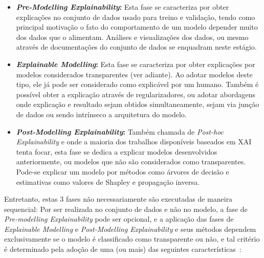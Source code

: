 \documentclass[portugues]{ic-tese}
\begin{document}
\begin{itemize}
\item \textbf{\textit{Pre-Modelling Explainability}:} Esta fase se caracteriza por obter explicações no conjunto de dados usado para treino e validação, tendo como principal motivação o fato do comportamento de um modelo depender muito dos dados que o alimentam. Análises e visualizações dos dados, ou mesmo através de documentações do conjunto de dados se enquadram neste estágio.~\citep{Khalegi_2019_Pre} 
\item \textbf{\textit{Explainable Modelling}:} Esta fase se caracteriza por obter explicações por modelos considerados transparentes (ver adiante). Ao adotar modelos deste tipo, ele já pode ser considerado como explicável por um humano. Também é possível obter a explicação através de regularizadores, ou adotar abordagens onde explicação e resultado sejam obtidos simultaneamente, sejam via junção de dados ou sendo intrínseco a arquitetura do modelo.~\citep{Khalegi_2019}
\item \textbf{\textit{Post-Modelling Explainability}:} Também chamada de \textit{Post-hoc Explainability} e onde a maioria dos trabalhos disponíveis baseados em XAI tenta focar, esta fase se dedica a explicar modelos desenvolvidos anteriormente, ou modelos que não são considerados como transparentes. Pode-se explicar um modelo por métodos como árvores de decisão e estimativas como valores de Shapley e propagação inversa.~\citep{Khalegi_2019_Post}
\end{itemize}

Entretanto, estas 3 fases não necessariamente são executadas de maneira sequencial: Por ser realizada no conjunto de dados e não no modelo, a fase de \textit{Pre-modelling Explainability} pode ser opcional, e a aplicação das fases de \textit{Explainable Modelling} e \textit{Post-Modelling Explainability} e seus métodos dependem exclusivamente se o modelo é classificado como transparente ou não, e tal critério é determinado pela adoção de uma (ou mais) das seguintes características~\citep{Arrieta_2020}:
\end{document}
